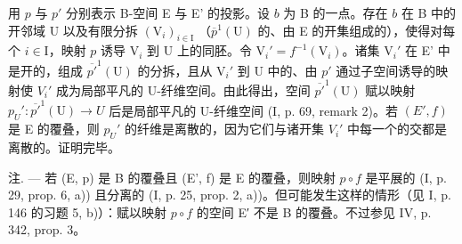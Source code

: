 用 \(p\) 与 \(p'\) 分别表示 B-空间 E 与 E' 的投影。设 \(b\) 为 B 的一点。存在 \(b\) 在 B 中的开邻域 U 以及有限分拆 \((\mathrm{V}_i)_{i\in \mathrm{I}}\) （\(\overline{p}^1 (\mathrm{U})\) 的、由 E 的开集组成的），使得对每个 \(i\in \mathrm{I}\)，映射 \(p\) 诱导 \(\mathrm{V}_i\) 到 U 上的同胚。令 \(\mathrm{V}_i' = f^{-1}(\mathrm{V}_i)\)。诸集 \(\mathrm{V}_i'\) 在 E' 中是开的，组成 \(\overline{p'}^{1}(\mathrm{U})\) 的分拆，且从 \(\mathrm{V}_i'\) 到 U 中的、由 \(p'\) 通过子空间诱导的映射使 \(V_i'\) 成为局部平凡的 U-纤维空间。由此得出，空间 \(\overline{p'}^{1}(\mathrm{U})\) 赋以映射 \(p_U': \overline{p'}^{1}(\mathrm{U}) \to U\) 后是局部平凡的 U-纤维空间 (I, p. 69, remark 2)。若 \((E', f)\) 是 E 的覆叠，则 \(p_U'\) 的纤维是离散的，因为它们与诸开集 \(V_i'\) 中每一个的交都是离散的。证明完毕。

注. --- 若 (E, p) 是 B 的覆叠且 (E', f) 是 E 的覆叠，则映射 \(p \circ f\) 是平展的 (I, p. 29, prop. 6, a)) 且分离的 (I, p. 25, prop. 2, a))。但可能发生这样的情形（见 I, p. 146 的习题 5, b)）：赋以映射 \(p \circ f\) 的空间 E′ 不是 B 的覆叠。不过参见 IV, p. 342, prop. 3。

